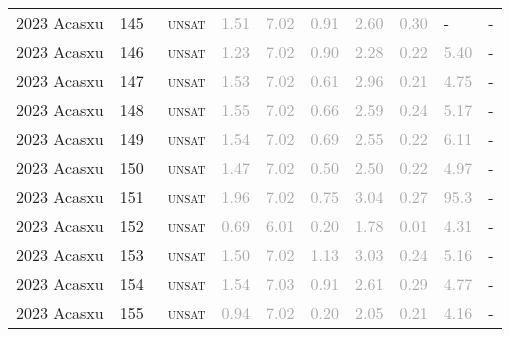 \begin{center}
{\begin{longtable}{@{}llllllllll@{}}
2023 Acasxu & 145 & ~\textsc{unsat} & \textcolor{darkgray}{1.51} & \textcolor{darkgray}{7.02} & \textcolor{darkgray}{0.91} & \textcolor{darkgray}{2.60} & \textcolor{darkgray}{0.30} & - & - \\
2023 Acasxu & 146 & ~\textsc{unsat} & \textcolor{darkgray}{1.23} & \textcolor{darkgray}{7.02} & \textcolor{darkgray}{0.90} & \textcolor{darkgray}{2.28} & \textcolor{darkgray}{0.22} & \textcolor{darkgray}{5.40} & - \\
2023 Acasxu & 147 & ~\textsc{unsat} & \textcolor{darkgray}{1.53} & \textcolor{darkgray}{7.02} & \textcolor{darkgray}{0.61} & \textcolor{darkgray}{2.96} & \textcolor{darkgray}{0.21} & \textcolor{darkgray}{4.75} & - \\
2023 Acasxu & 148 & ~\textsc{unsat} & \textcolor{darkgray}{1.55} & \textcolor{darkgray}{7.02} & \textcolor{darkgray}{0.66} & \textcolor{darkgray}{2.59} & \textcolor{darkgray}{0.24} & \textcolor{darkgray}{5.17} & - \\
2023 Acasxu & 149 & ~\textsc{unsat} & \textcolor{darkgray}{1.54} & \textcolor{darkgray}{7.02} & \textcolor{darkgray}{0.69} & \textcolor{darkgray}{2.55} & \textcolor{darkgray}{0.22} & \textcolor{darkgray}{6.11} & - \\
2023 Acasxu & 150 & ~\textsc{unsat} & \textcolor{darkgray}{1.47} & \textcolor{darkgray}{7.02} & \textcolor{darkgray}{0.50} & \textcolor{darkgray}{2.50} & \textcolor{darkgray}{0.22} & \textcolor{darkgray}{4.97} & - \\
2023 Acasxu & 151 & ~\textsc{unsat} & \textcolor{darkgray}{1.96} & \textcolor{darkgray}{7.02} & \textcolor{darkgray}{0.75} & \textcolor{darkgray}{3.04} & \textcolor{darkgray}{0.27} & \textcolor{darkgray}{95.3} & - \\
2023 Acasxu & 152 & ~\textsc{unsat} & \textcolor{darkgray}{0.69} & \textcolor{darkgray}{6.01} & \textcolor{darkgray}{0.20} & \textcolor{darkgray}{1.78} & \textcolor{darkgray}{0.01} & \textcolor{darkgray}{4.31} & - \\
2023 Acasxu & 153 & ~\textsc{unsat} & \textcolor{darkgray}{1.50} & \textcolor{darkgray}{7.02} & \textcolor{darkgray}{1.13} & \textcolor{darkgray}{3.03} & \textcolor{darkgray}{0.24} & \textcolor{darkgray}{5.16} & - \\
2023 Acasxu & 154 & ~\textsc{unsat} & \textcolor{darkgray}{1.54} & \textcolor{darkgray}{7.03} & \textcolor{darkgray}{0.91} & \textcolor{darkgray}{2.61} & \textcolor{darkgray}{0.29} & \textcolor{darkgray}{4.77} & - \\
2023 Acasxu & 155 & ~\textsc{unsat} & \textcolor{darkgray}{0.94} & \textcolor{darkgray}{7.02} & \textcolor{darkgray}{0.20} & \textcolor{darkgray}{2.05} & \textcolor{darkgray}{0.21} & \textcolor{darkgray}{4.16} & - \\

\end{longtable}}
\end{center}
